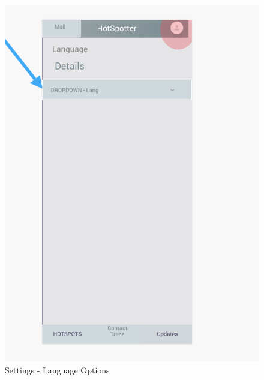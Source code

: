 \documentclass{scrreprt}
\begin{document}
\begin{figure}[H]
	\centering
	\includegraphics[page=1, width=0.9\linewidth]{COMP30830-Language}
	\caption{Settings - Language Options}
	\label{Language}
\end{figure}
\end{document}
